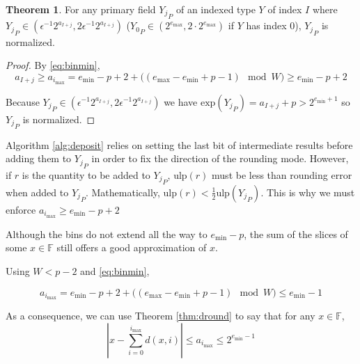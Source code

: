 \documentclass[12pt]{article}
\providecommand{\F}{\ensuremath{\mathbb{F}}}
\providecommand{\exp}{\ensuremath{\text{exp}}}
\providecommand{\min}{\ensuremath{\text{min}}}
\providecommand{\max}{\ensuremath{\text{max}}}
\providecommand{\ulp}{\ensuremath{\text{ulp}}}
\theoremstyle{definition}
\newtheorem{thm}{Theorem}[section]
\numberwithin{equation}{section}
\numberwithin{figure}{section}
\begin{document}
      \begin{samepage}
      \begin{thm}
        For any primary field ${Y_j}_P$ of an indexed type $Y$ of index $I$ where ${Y_j}_P \in (\epsilon^{-1} 2^{a_{I + j}}, 2 \epsilon^{-1} 2^{a_{I + j}})$ (${Y_0}_P \in (2^{e_{\max}}, 2 \cdot 2^{e_{\max}})$ if $Y$ has index 0), ${Y_j}_P$ is normalized.
        \label{thm:underflowufp}
      \end{thm}
      \end{samepage}

      \begin{proof}
        By \eqref{eq:binmin},
        \begin{equation*}
        a_{I + j} \geq a_{i_{\max}} = e_{\min} - p + 2 + \bigl((e_{\max} - e_{\min} + p - 1) \mod W\bigr) \geq e_{\min} - p + 2
        \end{equation*}

        Because ${Y_j}_P \in (\epsilon^{-1} 2^{a_{I + j}}, 2 \epsilon^{-1} 2^{a_{I + j}})$ we have $\exp({Y_j}_P) = a_{I + j} + p > 2^{e_{\min} + 1}$ so ${Y_j}_P$ is normalized.
      \end{proof}

      Algorithm \ref{alg:deposit} relies on setting the last bit of intermediate results before adding them to ${Y_j}_P$ in order to fix the direction of the rounding mode. However, if $r$ is the quantity to be added to ${Y_j}_P$, $\ulp(r)$ must be less than rounding error when added to ${Y_j}_P$. Mathematically, $\ulp(r) < \frac{1}{2}\ulp({Y_j}_P)$. This is why we must enforce $a_{i_{\max}} \geq e_{\min} - p + 2$

      Although the bins do not extend all the way to $e_{\min} - p$, the sum of the slices of some $x \in \F$ still offers a good approximation of $x$.

      Using $W < p - 2$ and \eqref{eq:binmin},

      \begin{equation*}
        a_{i_{\max}} = e_{\min} - p + 2 + \bigl((e_{\max} - e_{\min} + p - 1 ) \mod W\bigr) \leq {e_{\min} - 1}
      \end{equation*}

      As a consequence, we can use Theorem \ref{thm:dround} to say that for any $x \in \F$,
      \begin{equation}
        |x - \sum\limits_{i = 0}^{i_{\max}} d(x, i)| \leq a_{i_{\max}} \leq 2^{e_{\min} - 1}
        \label{eq:droundunderflow}
      \end{equation}
\end{document}
